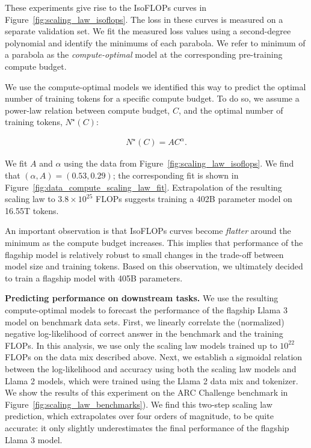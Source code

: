 These experiments give rise to the IsoFLOPs curves in Figure~\ref{fig:scaling_law_isoflops}.
The loss in these curves is measured on a separate validation set. We fit the measured loss values using a second-degree polynomial and identify the minimums of each parabola. We refer to minimum of a parabola as the \emph{compute-optimal} model at the corresponding pre-training compute budget.

We use the compute-optimal models we identified this way to predict the optimal number of training tokens for a specific compute budget. To do so, we assume a power-law relation between compute budget, $C$, and the optimal number of training tokens, $N^\star(C)$:

\begin{align*}
    N^\star(C) = A C^\alpha.
\end{align*}

We fit $A$ and $\alpha$ using the data from Figure~\ref{fig:scaling_law_isoflops}.
We find that $(\alpha, A) = (0.53, 0.29)$; the corresponding fit is shown in Figure~\ref{fig:data_compute_scaling_law_fit}.
Extrapolation of the resulting scaling law to $3.8 \times 10^{25}$ FLOPs suggests training a 402B parameter model on 16.55T tokens.

An important observation is that IsoFLOPs curves become \emph{flatter} around the minimum as the compute budget increases. This implies that performance of the flagship model is relatively robust to small changes in the trade-off between model size and training tokens. Based on this observation, we ultimately decided to train a flagship model with 405B parameters.

\textbf{Predicting performance on downstream tasks.} We use the resulting compute-optimal models to forecast the performance of the flagship Llama 3 model on benchmark data sets. First, we linearly correlate the (normalized) negative log-likelihood of correct answer in the benchmark and the training FLOPs. In this analysis, we use only the scaling law models trained up to $10^{22}$ FLOPs on the data mix described above. Next, we establish a sigmoidal relation between the log-likelihood and accuracy using both the scaling law models and Llama 2 models, which were trained using the Llama 2 data mix and tokenizer. We show the results of this experiment on the ARC Challenge benchmark in Figure~\ref{fig:scaling_law_benchmarks}).
We find this two-step scaling law prediction, which extrapolates over four orders of magnitude, to be quite accurate: it only slightly underestimates the final performance of the flagship Llama 3 model.

